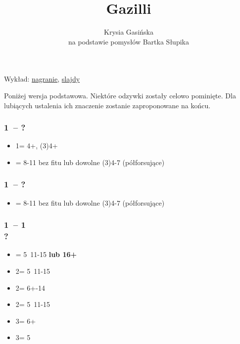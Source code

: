\documentclass[12pt, a4paper]{article}
\title{\fontsize{30pt}{30pt}\selectfont Gazilli}
\author{Krysia Gasińska\\
        \small{na podstawie pomysłów Bartka Słupika}}
\begin{document}
\maketitle

\begin{formal}
Wykład: \href{https://www.youtube.com/@multi2diamonds}{nagranie}, 
\href{https://docs.google.com/presentation/d/1v0ixVhsnCNkZk1ckHag8bozFfjcQ0ZeFr_HqXATM9Xk/edit?usp=sharing}{slajdy}
\vspace{0.3cm}
\end{formal}

Poniżej wersja podstawowa. Niektóre odzywki zostały celowo pominięte. Dla lubiących ustalenia ich znaczenie
zostanie zaproponowane na końcu.

\subsubsection*{1\hearts\ -- ?}
\begin{itemize}
    \item 1\spades = 4+\spades, (3)4+ \hcp
    \item \alrts{1\ntx} = 8-11 bez fitu lub dowolne (3)4-7 (półforsujące)
\end{itemize}

\subsubsection*{1\spades\ -- ?}
\begin{itemize}
    \item \alrts{1\ntx} = 8-11 bez fitu lub dowolne (3)4-7 (półforsujące)
\end{itemize}

\subsubsection*{1\hearts\ -- 1\spades\ \\ ?}
\begin{itemize}
    \item \alrts{2\clubs} = 5\clubs\ 11-15 \textbf{lub 16+} \fonce \imp
    \item 2\diams = 5\diams\ 11-15
    \item 2\hearts = 6+-14
    \item 2\spades = 5\spades\ 11-15
    \item 3\hearts = 6+\hearts\ \inv
    \item 3\spades = 5\spades\ \inv
\end{itemize}
\end{document}
